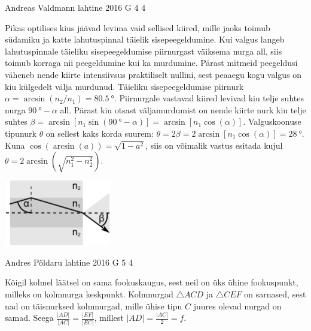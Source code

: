 \documentclass[11pt, twoside]{article}
\begin{document}
{%
{Andreas Valdmann} %
{lahtine} %
{2016} %
{G 4} %
{4} %
{

\ifSolution
Pikas optilises kius jäävad levima vaid sellised kiired, mille jaoks toimub südamiku ja katte lahutuspinnal täielik sisepeegeldumine. Kui valgus langeb lahutuspinnale täieliku sisepeegeldumise piirnurgast väiksema nurga all, siis toimub korraga nii peegeldumine kui ka murdumine. Pärast mitmeid peegeldusi väheneb nende kiirte intensiivsus praktiliselt nullini, sest peaaegu kogu valgus on kiu külgedelt välja murdunud. Täieliku sisepeegeldumise piirnurk $\alpha=\arcsin(n_2/n_1)=\SI{80,5}{\degree}$. Piirnurgale vastavad kiired levivad kiu telje suhtes nurga $\SI{90}{\degree}-\alpha$ all. Pärast kiu otsast väljamurdumist on nende kiirte nurk kiu telje suhtes $\beta=\arcsin[n_1\sin(\SI{90}{\degree}-\alpha)]=\arcsin[n_1\cos(\alpha)]$. Valguskoonuse tipunurk $\theta$ on sellest kaks korda suurem: $\theta=2\beta=2\arcsin[n_1\cos(\alpha)]=\SI{28}{\degree}$. Kuna $\cos(\arcsin(a))=\sqrt{1-a^2}$, siis on võimalik vastus esitada kujul $\theta=2\arcsin(\sqrt{n_1^2-n_2^2})$.

\begin{center}
    \includegraphics[width=0.35\textwidth]{2016-lahg-04-kiud}
\end{center}
\fi
}

{Andres Põldaru} %
{lahtine} %
{2016} %
{G 5} %
{4} %
{

\ifSolution
Kõigil kolmel läätsel on sama fookuskaugus, sest neil on üks ühine fookuspunkt, milleks on kolmnurga keskpunkt. Kolmnurgad $\triangle ACD$ ja $\triangle CEF$ on sarnased, sest nad on täisnurksed kolmnurgad, mille ühise tipu $C$ juures olevad nurgad on samad. Seega $\frac{|AD|}{|AC|}=\frac{|EF|}{|EC|}$, millest $|AD| = \frac{|AC|}{2} = f$.

}}
\end{document}
